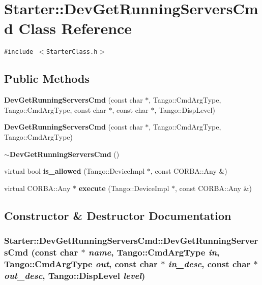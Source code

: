 \section{Starter::Dev\-Get\-Running\-Servers\-Cmd  Class Reference}
\label{classStarter_1_1DevGetRunningServersCmd}
{\tt \#include $<$Starter\-Class.h$>$}

\subsection*{Public Methods}
\begin{CompactItemize}
\item 
{\bf Dev\-Get\-Running\-Servers\-Cmd} (const char $\ast$, Tango::Cmd\-Arg\-Type, Tango::Cmd\-Arg\-Type, const char $\ast$, const char $\ast$, Tango::Disp\-Level)
\item 
{\bf Dev\-Get\-Running\-Servers\-Cmd} (const char $\ast$, Tango::Cmd\-Arg\-Type, Tango::Cmd\-Arg\-Type)
\item 
{\bf $\sim$Dev\-Get\-Running\-Servers\-Cmd} ()
\item 
virtual bool {\bf is\_\-allowed} (Tango::Device\-Impl $\ast$, const CORBA::Any \&)
\item 
virtual CORBA::Any $\ast$ {\bf execute} (Tango::Device\-Impl $\ast$, const CORBA::Any \&)
\end{CompactItemize}


\subsection{Constructor \& Destructor Documentation}
\subsubsection{\setlength{\rightskip}{0pt plus 5cm}Starter::Dev\-Get\-Running\-Servers\-Cmd::Dev\-Get\-Running\-Servers\-Cmd (const char $\ast$ {\em name}, Tango::Cmd\-Arg\-Type {\em in}, Tango::Cmd\-Arg\-Type {\em out}, const char $\ast$ {\em in\_\-desc}, const char $\ast$ {\em out\_\-desc}, Tango::Disp\-Level {\em level})}\label{classStarter_1_1DevGetRunningServersCmd_a0}


